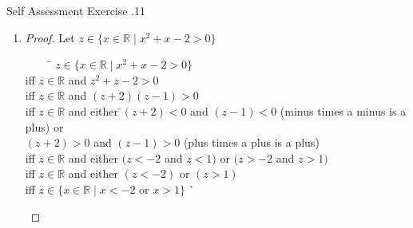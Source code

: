 \documentclass[../notes.tex]{subfiles}
\begin{document}
\begin{exercise}{Self Assessment Exercise \thechapter.11}
\begin{enumerate}
\begin{proof}
\begin{tabbing}
								iff \> $w \in \mathbb{Z}$ and $(w < 4$ and $w > 1)$\\
								iff \> $w \in \mathbb{Z}^{+}$ and \=$(1 < w < 4)$\\
								\> \> ($\mathbb{Z}^{+}$ as all the numbers are positive)\\
								iff \> $w \in \mathbb{Z}^{+}$ and $w \in \{2, 3\}$\\
								iff \> $w \in \{x \in \mathbb{Z}^{+} \mid x \in \{2, 3\}\}$\\
								iff \> $w \in \{x \in \mathbb{Z}^{+} \mid x$ is a prime factor of $6\}$ \` \qedhere
							\end{tabbing}
						\end{proof}
					\item {}
						\begin{proof}
							Let $z \in \{x \in \mathbb{R} \mid x^{2} + x - 2 > 0\}$
							\begin{tabbing}
								$\qquad$ \= $z \in \{x \in \mathbb{R} \mid x^{2} + x - 2 > 0\}$\\
								iff \> $z \in \mathbb{R}$ and $z^{2} + z - 2 > 0$\\
								iff \> $z \in \mathbb{R}$ and $(z + 2)(z - 1) > 0$\\
								iff \> $z \in \mathbb{R}$ and either \=$(z + 2) < 0$ and $(z - 1) < 0$ (minus times a minus is a plus) or\\
								\> \> $(z + 2)> 0$ and $(z - 1) > 0$ (plus times a plus is a plus)\\
								iff \> $z \in \mathbb{R}$ and either $(z < -2$ and $z < 1)$ or $(z > -2$ and $z > 1)$\\
								iff \> $z \in \mathbb{R}$ and either $(z < -2)$ or $(z > 1)$\\
								iff \> $z \in \{x \in \mathbb{R} \mid x < -2$ or $x > 1\}$ \` \qedhere
							\end{tabbing}
						\end{proof}
				\end{enumerate}
			\end{exercise}
			\pagebreak
\end{document}
